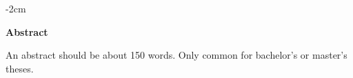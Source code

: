 %
%
%

\ifx {}\istrue

\thispagestyle{empty}

\begin{adjustwidth}{-2cm}{}
\vspace*{5\baselineskip}\vphantom{}
\begin{Huge}\textbf{Abstract}\end{Huge} \vspace*{2\baselineskip}\vphantom{}


An abstract should be about 150 words. Only common for bachelor's or master's theses.



\end{adjustwidth}

\fi

